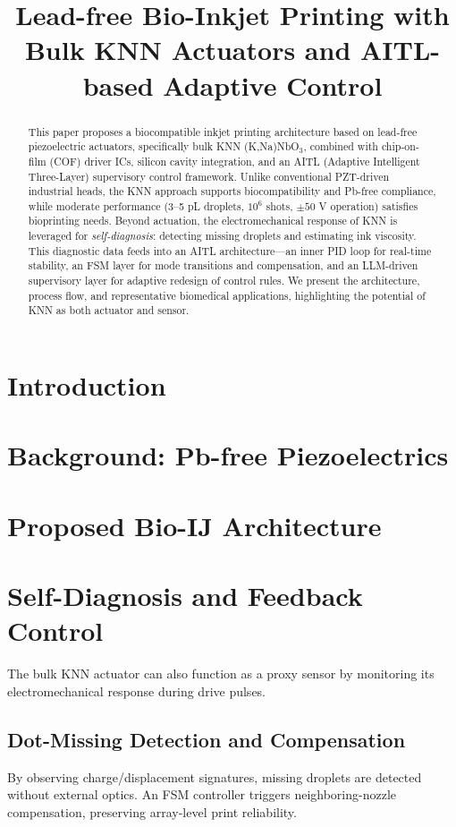 \documentclass[conference]{IEEEtran}
\title{Lead-free Bio-Inkjet Printing with Bulk KNN Actuators and AITL-based Adaptive Control}
\author{
  \IEEEauthorblockN{Shinichi Samizo}
  \IEEEauthorblockA{Independent Semiconductor Researcher\\
  Former Engineer at Seiko Epson Corporation\\
  Email: \href{mailto:shin3t72@gmail.com}{shin3t72@gmail.com}\\
  GitHub: \url{https://github.com/Samizo-AITL}}
}
\begin{document}
\maketitle

\begin{abstract}
This paper proposes a biocompatible inkjet printing architecture based on
lead-free piezoelectric actuators, specifically bulk KNN (K,Na)NbO$_3$, combined
with chip-on-film (COF) driver ICs, silicon cavity integration, and
an AITL (Adaptive Intelligent Three-Layer) supervisory control framework.
Unlike conventional PZT-driven industrial heads, the KNN approach supports
biocompatibility and Pb-free compliance, while moderate performance
(3--5 pL droplets, $10^6$ shots, $\pm50$ V operation) satisfies bioprinting needs.
Beyond actuation, the electromechanical response of KNN is leveraged for
\emph{self-diagnosis}: detecting missing droplets and estimating ink viscosity.
This diagnostic data feeds into an AITL architecture---an inner PID loop for
real-time stability, an FSM layer for mode transitions and compensation,
and an LLM-driven supervisory layer for adaptive redesign of control rules.
We present the architecture, process flow, and representative biomedical
applications, highlighting the potential of KNN as both actuator and sensor.
\end{abstract}

\section{Introduction}


\section{Background: Pb-free Piezoelectrics}


\section{Proposed Bio-IJ Architecture}


\section{Self-Diagnosis and Feedback Control}
The bulk KNN actuator can also function as a proxy sensor by monitoring
its electromechanical response during drive pulses.
\subsection{Dot-Missing Detection and Compensation}
By observing charge/displacement signatures, missing droplets are detected
without external optics. An FSM controller triggers neighboring-nozzle
compensation, preserving array-level print reliability.
\end{document}
